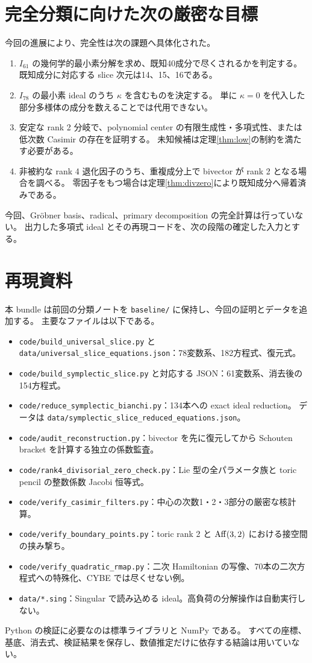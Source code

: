 \documentclass[11pt,a4paper]{ltjsarticle}
\theoremstyle{remark}\newtheorem{remark}[theorem]{注意}\renewcommand{\proofname}{証明}
\begin{document}
\section{完全分類に向けた次の厳密な目標}
今回の進展により、完全性は次の課題へ具体化された。
\begin{enumerate}
 \item $I_{61}$ の幾何学的最小素分解を求め、既知40成分で尽くされるかを判定する。
 既知成分に対応する slice 次元は14、15、16である。
 \item $I_{78}$ の最小素 ideal のうち $\kappa$ を含むものを決定する。
 単に $\kappa=0$ を代入した部分多様体の成分を数えることでは代用できない。
 \item 安定な rank 2 分岐で、polynomial center の有限生成性・多項式性、または低次数 Casimir の存在を証明する。
 未知候補は定理\ref{thm:low}の制約を満たす必要がある。
 \item 非被約な rank 4 退化因子のうち、重複成分上で bivector が rank 2 となる場合を調べる。
 零因子をもつ場合は定理\ref{thm:divzero}により既知成分へ帰着済みである。
\end{enumerate}
今回、Gr\"obner basis、radical、primary decomposition の完全計算は行っていない。
出力した多項式 ideal とその再現コードを、次の段階の確定した入力とする。

\section{再現資料}
本 bundle は前回の分類ノートを \texttt{baseline/} に保持し、今回の証明とデータを追加する。
主要なファイルは以下である。
\begin{itemize}
 \item \texttt{code/build\_universal\_slice.py} と \texttt{data/universal\_slice\_equations.json}：78変数系、182方程式、復元式。
 \item \texttt{code/build\_symplectic\_slice.py} と対応する JSON：61変数系、消去後の154方程式。
 \item \texttt{code/reduce\_symplectic\_bianchi.py}：134本への exact ideal reduction。
 データは \texttt{data/symplectic\_slice\_reduced\_equations.json}。
 \item \texttt{code/audit\_reconstruction.py}：bivector を先に復元してから Schouten bracket を計算する独立の係数監査。
 \item \texttt{code/rank4\_divisorial\_zero\_check.py}：Lie 型の全パラメータ族と toric pencil の整数係数 Jacobi 恒等式。
 \item \texttt{code/verify\_casimir\_filters.py}：中心の次数1・2・3部分の厳密な核計算。
 \item \texttt{code/verify\_boundary\_points.py}：toric rank 2 と $\operatorname{Aff}(3,2)$ における接空間の挟み撃ち。
 \item \texttt{code/verify\_quadratic\_rmap.py}：二次 Hamiltonian の写像、70本の二次方程式への特殊化、CYBE では尽くせない例。
 \item \texttt{data/*.sing}：Singular で読み込める ideal。高負荷の分解操作は自動実行しない。
\end{itemize}
Python の検証に必要なのは標準ライブラリと NumPy である。
すべての座標、基底、消去式、検証結果を保存し、数値推定だけに依存する結論は用いていない。
\end{document}
